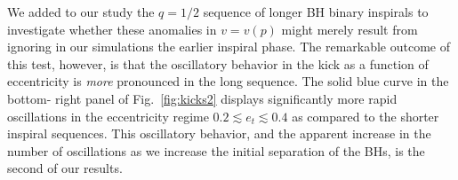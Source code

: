 \documentclass[floats,floatfix,showpacs,amssymb,prd,twocolumn,superscriptaddress,nofootinbib,nolongbibliography,reprint]{revtex4-2}
\newcommand{\mr}[1]{{\textcolor{cyan}{\sf{[MR: #1]}} }}
\newcommand{\us}[1]{{\textcolor{teal}{\sf{[US: #1]}} }}
\newcommand{\rad}{\mathrm{rad}}
\begin{document}
We added
to our study the $q = 1/2$ sequence of longer BH binary inspirals to
investigate whether these anomalies in $v=v(p)$ might merely result
from ignoring in our simulations the earlier inspiral phase. The
remarkable outcome of this test, however, is that the oscillatory
behavior in the kick as a function of eccentricity is \emph{more}
pronounced in the long sequence.  The solid blue curve in the
bottom-%
right panel of Fig.~\ref{fig:kicks2} displays significantly more
rapid oscillations in the eccentricity regime
$0.2\lesssim e_t \lesssim 0.4$ as compared to the shorter inspiral
sequences.  This oscillatory behavior, and the apparent increase in
the number of oscillations as we increase the initial separation of
the BHs, is the second of our results.
\end{document}
